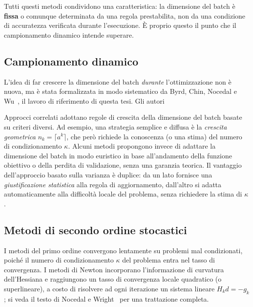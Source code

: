 Tutti questi metodi condividono una caratteristica: la dimensione del batch è
\textbf{fissa} o comunque determinata da una regola prestabilita, non da una
condizione di accuratezza verificata durante l'esecuzione. È proprio questo il
punto che il campionamento dinamico intende superare.

\subsection{Campionamento dinamico}

L'idea di far crescere la dimensione del batch \emph{durante} l'ottimizzazione
non è nuova, ma è stata formalizzata in modo sistematico da Byrd, Chin, Nocedal
e Wu~\cite{byrd2012}, il lavoro di riferimento di questa tesi. Gli autori

Approcci correlati adottano regole di crescita della dimensione del batch
basate su criteri diversi. Ad esempio, una strategia semplice e diffusa è la
\emph{crescita geometrica} $n_k = \lceil a^k \rceil$, che però richiede la
conoscenza (o una stima) del numero di condizionamento $\kappa$. Alcuni metodi
propongono invece di adattare la dimensione del batch in modo euristico in base
all'andamento della funzione obiettivo o della perdita di validazione, senza
una garanzia teorica. Il vantaggio dell'approccio basato sulla varianza è
duplice: da un lato fornisce una \emph{giustificazione statistica} alla regola
di aggiornamento, dall'altro si adatta automaticamente alla difficoltà locale
del problema, senza richiedere la stima di $\kappa$.

\subsection{Metodi di secondo ordine stocastici}

I metodi del primo ordine convergono lentamente su problemi mal condizionati,
poiché il numero di condizionamento $\kappa$ del problema entra nel tasso di
convergenza. I metodi di Newton incorporano l'informazione di curvatura
dell'Hessiana e raggiungono un tasso di convergenza locale quadratico (o
superlineare), a costo di risolvere ad ogni iterazione un sistema lineare
$H_k d = -g_k$; si veda il testo di Nocedal e Wright~\cite{nocedal2006} per
una trattazione completa.

